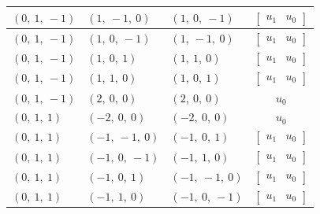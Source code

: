 \documentclass[11pt]{article}
\theoremstyle{definition}
\begin{document}
\begin{longtable}{|l|l|l|c|}
    \hline
    $\left( 0, \  1, \  -1\right)$ & $\left( 1, \  -1, \  0\right)$ & $\left( 1, \  0, \  -1\right)$ & $\left[\begin{matrix}u_{1} & u_{0}\end{matrix}\right]$ \\
    \hline
    $\left( 0, \  1, \  -1\right)$ & $\left( 1, \  0, \  -1\right)$ & $\left( 1, \  -1, \  0\right)$ & $\left[\begin{matrix}u_{1} & u_{0}\end{matrix}\right]$ \\
    \hline
    $\left( 0, \  1, \  -1\right)$ & $\left( 1, \  0, \  1\right)$ & $\left( 1, \  1, \  0\right)$ & $\left[\begin{matrix}u_{1} & u_{0}\end{matrix}\right]$ \\
    \hline
    $\left( 0, \  1, \  -1\right)$ & $\left( 1, \  1, \  0\right)$ & $\left( 1, \  0, \  1\right)$ & $\left[\begin{matrix}u_{1} & u_{0}\end{matrix}\right]$ \\
    \hline
    $\left( 0, \  1, \  -1\right)$ & $\left( 2, \  0, \  0\right)$ & $\left( 2, \  0, \  0\right)$ & $u_{0}$ \\
    \hline
    $\left( 0, \  1, \  1\right)$ & $\left( -2, \  0, \  0\right)$ & $\left( -2, \  0, \  0\right)$ & $u_{0}$ \\
    \hline
    $\left( 0, \  1, \  1\right)$ & $\left( -1, \  -1, \  0\right)$ & $\left( -1, \  0, \  1\right)$ & $\left[\begin{matrix}u_{1} & u_{0}\end{matrix}\right]$ \\
    \hline
    $\left( 0, \  1, \  1\right)$ & $\left( -1, \  0, \  -1\right)$ & $\left( -1, \  1, \  0\right)$ & $\left[\begin{matrix}u_{1} & u_{0}\end{matrix}\right]$ \\
    \hline
    $\left( 0, \  1, \  1\right)$ & $\left( -1, \  0, \  1\right)$ & $\left( -1, \  -1, \  0\right)$ & $\left[\begin{matrix}u_{1} & u_{0}\end{matrix}\right]$ \\
    \hline
    $\left( 0, \  1, \  1\right)$ & $\left( -1, \  1, \  0\right)$ & $\left( -1, \  0, \  -1\right)$ & $\left[\begin{matrix}u_{1} & u_{0}\end{matrix}\right]$ \\

\end{longtable}
\end{document}
